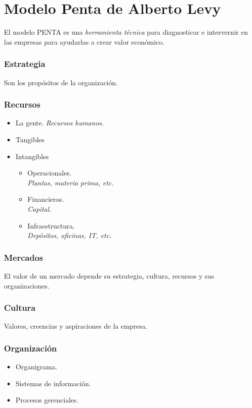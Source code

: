 \documentclass[10pt, spanish, a5paper]{article}
\begin{document}
\part{Modelo Penta de Alberto Levy}

El modelo PENTA es una \emph{herramienta técnica} para diagnosticar e intervernir en las empresas para ayudarlas a crear valor económico.

\section{Estrategia}
Son los propósitos de la organización.

\section{Recursos}

\begin{itemize}
	\item La gente. \textit{Recursos humanos.}
	\item Tangibles
	\item Intangibles
		\begin{itemize}
			\item Operacionales.\\
			\textit{Plantas, materia prima, etc.}
			\item Financieros.\\
			\textit{Capital}.
			\item Infraestructura. \\
			\textit{Depósitos, oficinas, IT, etc.}
		\end{itemize}
\end{itemize}

\section{Mercados}

El valor de un mercado depende su estrategia, cultura, recursos y sus organizaciones.

\section{Cultura}
Valores, creencias y aspiraciones de la empresa.

\section{Organización}
\begin{itemize}
	\item Organigrama.
	\item Sistemas de información.
	\item Procesos gerenciales.
\end{itemize}
\end{document}
